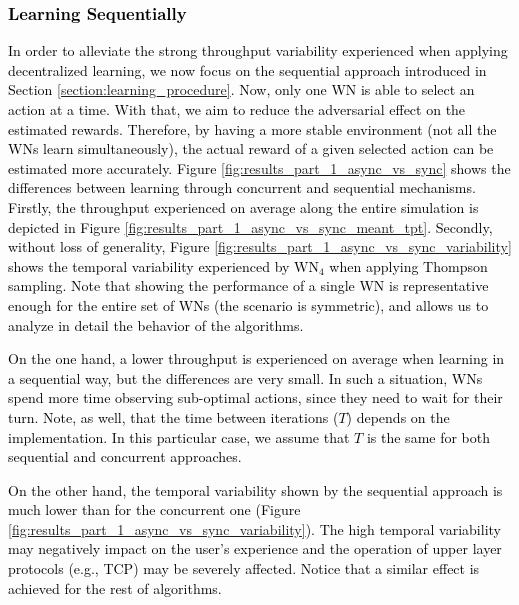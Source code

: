 \documentclass{article}
\begin{document}
	\textcolor{black}{\subsubsection{Learning Sequentially}}
	\label{section:proposed_method}
	
	\textcolor{black}{In order to alleviate the strong throughput variability experienced when applying decentralized learning, we now focus on the sequential approach introduced in Section \ref{section:learning_procedure}. Now, only one WN is able to select an action at a time. With that, we aim to reduce the adversarial effect on the estimated rewards. Therefore, by having a more stable environment (not all the WNs learn simultaneously), the actual reward of a given selected action can be estimated more accurately. Figure \ref{fig:results_part_1_async_vs_sync} shows the differences between learning through concurrent and sequential mechanisms. Firstly, the throughput experienced on average along the entire simulation is depicted in Figure \ref{fig:results_part_1_async_vs_sync_meant_tpt}. Secondly, without loss of generality, Figure \ref{fig:results_part_1_async_vs_sync_variability} shows the temporal variability experienced by $\text{WN}_4$ when applying Thompson sampling. Note that showing the performance of a single WN is representative enough for the entire set of WNs (the scenario is symmetric), and allows us to analyze in detail the behavior of the algorithms.}
	
	\textcolor{black}{On the one hand, a lower throughput is experienced on average when learning in a sequential way, but the differences are very small. In such a situation, WNs spend more time observing sub-optimal actions, since they need to wait for their turn. Note, as well, that the time between iterations ($T$) depends on the implementation. In this particular case, we assume that $T$ is the same for both sequential and concurrent approaches.}
	
	\textcolor{black}{On the other hand, the temporal variability shown by the sequential approach is much lower than for the concurrent one (Figure \ref{fig:results_part_1_async_vs_sync_variability}). The high temporal variability may negatively impact on the user's experience and the operation of upper layer protocols (e.g., TCP) may be severely affected. Notice that a similar effect is achieved for the rest of algorithms.}
	
\end{document}
